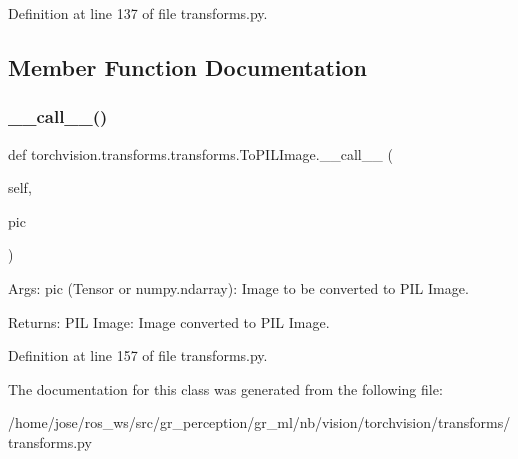 Definition at line 137 of file transforms.\+py.



\subsection{Member Function Documentation}
\mbox{\label{classtorchvision_1_1transforms_1_1transforms_1_1ToPILImage_a14627896935e3847a17bc058c8b8ed91}} 
\subsubsection{\texorpdfstring{\+\_\+\+\_\+call\+\_\+\+\_\+()}{\_\_call\_\_()}}
{\footnotesize\ttfamily def torchvision.\+transforms.\+transforms.\+To\+P\+I\+L\+Image.\+\_\+\+\_\+call\+\_\+\+\_\+ (\begin{DoxyParamCaption}\item[{}]{self,  }\item[{}]{pic }\end{DoxyParamCaption})}

\begin{DoxyVerb}Args:
    pic (Tensor or numpy.ndarray): Image to be converted to PIL Image.

Returns:
    PIL Image: Image converted to PIL Image.\end{DoxyVerb}
 

Definition at line 157 of file transforms.\+py.



The documentation for this class was generated from the following file\+:\begin{DoxyCompactItemize}
\item 
/home/jose/ros\+\_\+ws/src/gr\+\_\+perception/gr\+\_\+ml/nb/vision/torchvision/transforms/transforms.\+py\end{DoxyCompactItemize}
